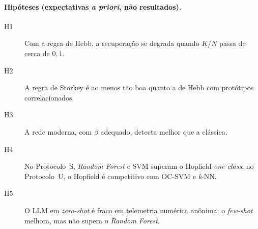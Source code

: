 \paragraph{Hipóteses (expectativas \emph{a priori}, não resultados).}
\begin{description}
  \item[H1] Com a regra de Hebb, a recuperação se degrada quando $K/N$ passa de cerca de $0{,}1$.
  \item[H2] A regra de Storkey é ao menos tão boa quanto a de Hebb com protótipos correlacionados.
  \item[H3] A rede moderna, com $\beta$ adequado, detecta melhor que a clássica.
  \item[H4] No Protocolo~S, \emph{Random Forest} e SVM superam o Hopfield \emph{one-class}; no Protocolo~U, o
        Hopfield é competitivo com OC-SVM e \emph{k}-NN.
  \item[H5] O LLM em \emph{zero-shot} é fraco em telemetria numérica anônima; o \emph{few-shot} melhora, mas não
        supera o \emph{Random Forest}.
\end{description}

